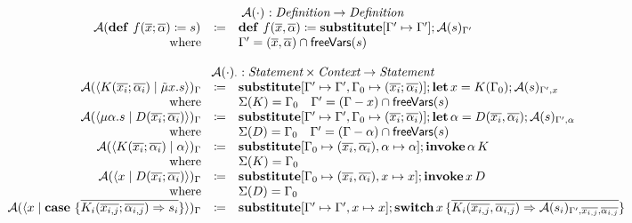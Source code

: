 \[
  \begin{array}{rcll}
    \multicolumn{4}{c}{\axcutify{\cdot}{} : \emph{Definition} \rightarrow \emph{Definition}}\\
    \axcutify{\defi{f(\overline{x}; \overline{\alpha})}{s}}{} & \coloneq & \defi{f(\overline{x}, \overline{\alpha})}{\substitute{\Gamma' \mapsto \Gamma'}{\axcutify{s}{\Gamma'}}} & \\
    \text{where} &  & \Gamma' = (\overline{x}, \overline{\alpha}) \cap \free{s} & \\
    \\
    \multicolumn{4}{c}{\axcutify{\cdot}{\cdot} : \emph{Statement} \times \emph{Context} \rightarrow \emph{Statement}}\\
    \axcutify{\cut{K(\overline{x_i}; \overline{\alpha_i})}{\tilde{\mu}x.s}}{\Gamma} & \coloneq & \substitute{\Gamma' \mapsto \Gamma', \Gamma_0 \mapsto (\overline{x_i}; \overline{\alpha_i})}{\letac{x}{K(\Gamma_0)}{\axcutify{s}{\Gamma', x}}} & \\
    \text{where} &  & \Sigma(K) = \Gamma_0  \quad  \Gamma' = (\Gamma - x) \cap \free{s} & \\
    \axcutify{\cut{\mu\alpha.s}{D(\overline{x_i}; \overline{\alpha_i})}}{\Gamma} & \coloneq & \substitute{\Gamma' \mapsto \Gamma', \Gamma_0 \mapsto (\overline{x_i}; \overline{\alpha_i})}{\letac{\alpha}{D(\overline{x_i}, \overline{\alpha_i})}{\axcutify{s}{\Gamma', \alpha}}} & \\
    \text{where} &  & \Sigma(D) = \Gamma_0  \quad  \Gamma' = (\Gamma - \alpha) \cap \free{s} & \\
    \axcutify{\cut{K(\overline{x_i}; \overline{\alpha_i})}{\alpha}}{\Gamma} & \coloneq & \substitute{\Gamma_0 \mapsto (\overline{x_i}, \overline{\alpha_i}), \alpha \mapsto \alpha}{\invoke{\alpha}{K}} & \\
    \text{where} &  & \Sigma(K) = \Gamma_0 & \\
    \axcutify{\cut{x}{D(\overline{x_i}; \overline{\alpha_i})}}{\Gamma} & \coloneq & \substitute{\Gamma_0 \mapsto (\overline{x_i}, \overline{\alpha_i}), x \mapsto x}{\invoke{x}{D}} & \\
    \text{where} &  & \Sigma(D) = \Gamma_0 & \\
    \axcutify{\cut{x}{\case{\overline{K_i(\overline{x_{i,j}}; \overline{\alpha_{i,j}}) \Rightarrow s_i}}}}{\Gamma} & \coloneq & \substitute{\Gamma' \mapsto \Gamma', x \mapsto x}{\switch{x}{\bra{\overline{K_i(\overline{x_{i,j}}, \overline{\alpha_{i,j}}) \Rightarrow \axcutify{s_i}{\Gamma', \overline{x_{i,j}}, \overline{\alpha_{i,j}}}}}}} & \\

\end{array}\]
